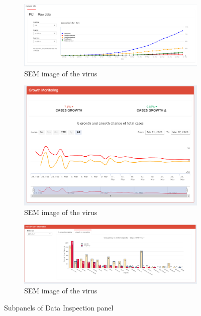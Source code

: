 \documentclass[
12pt, %
a4paper, %
oneside, %
headinclude,footinclude, %
BCOR5mm, %
]{scrartcl}
\begin{document}
\begin{figure}[H]
  \centering
\begin{subfigure}{0.8\textwidth}
  \centering
  \includegraphics[width=1\linewidth]{Figures/Inspection_general_info.png} 
  \caption{SEM image of the virus}
  \label{fig:Inspection_general_info}
\end{subfigure} 
\begin{subfigure}{0.8\textwidth}
  \centering
  \includegraphics[width=1\linewidth]{Figures/Inspection_growth_monitoring.png} 
  \caption{SEM image of the virus}
  \label{fig:Inspection_growth_monitoring}
\end{subfigure} 
\begin{subfigure}{0.8\textwidth}
  \centering
  \includegraphics[width=1\linewidth]{Figures/Inspection_occupancy2.png} 
  \caption{SEM image of the virus}
  \label{fig:Inspection_occupancy2}
\end{subfigure}\hspace{0.3\textwidth}
\label{fig:Inspection_panels_2}
\caption{Subpanels of Data Inspection panel }
\end{figure}
\end{document}
